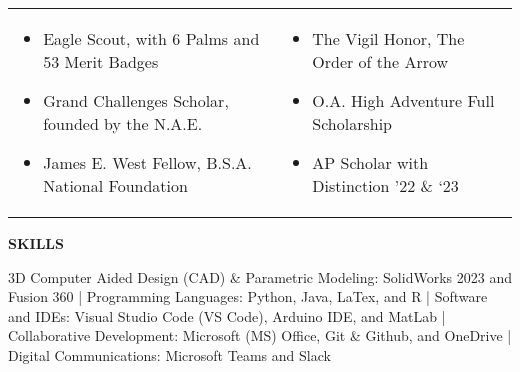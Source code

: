 \documentclass[18pt]{article}
\begin{document}
\begin{tabular}{p{}p{}}

\begin{itemize}[noitemsep]
  \vspace{-0.5\baselineskip}
  \item \hspace{-0.1in} Eagle Scout, with 6 Palms and 53 Merit Badges
  \item \hspace{-0.1in} Grand Challenges Scholar, founded by the N.A.E. 
  \item \hspace{-0.1in} James E. West Fellow, B.S.A. National Foundation
  \vspace{-0.5\baselineskip}
  \end{itemize}
  &
\begin{itemize}[noitemsep]
  \vspace{-0.5\baselineskip}
  \item The Vigil Honor, The Order of the Arrow 
  \item O.A. High Adventure Full Scholarship
  \item AP Scholar with Distinction ’22 \& ‘23 
  \vspace{-0.5\baselineskip}
  
\end{itemize}\\

\end{tabular}

\vspace{-0.75\baselineskip}
\begin{center}
    \textbf{SKILLS}
    \hrulefill
\end{center}
\vspace{-0.75\baselineskip}


\justify 3D Computer Aided Design (CAD) \& Parametric Modeling: SolidWorks 2023 and Fusion 360 | Programming Languages: Python, Java, LaTex, and R | Software and IDEs: Visual Studio Code (VS Code), Arduino IDE, and MatLab | Collaborative Development: Microsoft (MS) Office, Git \& Github, and OneDrive | Digital Communications: Microsoft Teams and Slack 
\end{document}
